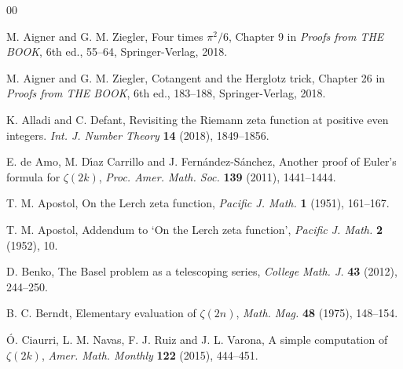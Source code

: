 \documentclass[11pt, oneside]{article}
\theoremstyle{plain}
\theoremstyle{definition}
\begin{document}
\begin{thebibliography}{00}

M. Aigner and G. M. Ziegler, %
Four times $\pi^2/6$,
Chapter 9 in
\textit{Proofs from THE BOOK}, 6th ed.,
55--64,
Springer-Verlag, 2018.

M. Aigner and G. M. Ziegler, %
Cotangent and the Herglotz trick,
Chapter 26 in
\textit{Proofs from THE BOOK}, 6th ed.,
183--188,
Springer-Verlag, 2018.

K. Alladi and C. Defant,
Revisiting the Riemann zeta function at positive even integers.
\textit{Int. J. Number Theory} \textbf{14} (2018), 1849--1856. %

{E. de Amo, M. D\'{\i}az Carrillo and J. Fern\'{a}ndez-S\'{a}nchez},
Another proof of Euler's formula for $\zeta(2k)$,
\textit{Proc. Amer. Math. Soc.} 
\textbf{139} (2011), 1441--1444.

T. M. Apostol,
{On the Lerch zeta function},
\textit{Pacific J. Math.} \textbf{1} (1951), 161--167.

T. M. Apostol,
{Addendum to `On the Lerch zeta function'}, 
\textit{Pacific J. Math.} \textbf{2} (1952), 10.

D. Benko, 
{The Basel problem as a telescoping series}, 
\textit{College Math. J.} \textbf{43} (2012), 244--250.

B. C. Berndt, 
Elementary evaluation of $\zeta(2n)$, 
\textit{Math. Mag.} \textbf{48} (1975), 148--154.



\'O. Ciaurri, L. M. Navas, F. J. Ruiz and J. L. Varona, 
{A simple computation of $\zeta(2k)$}, 
\textit{Amer. Math. Monthly} \textbf{122} (2015), 444--451.


\end{thebibliography}
\end{document}
